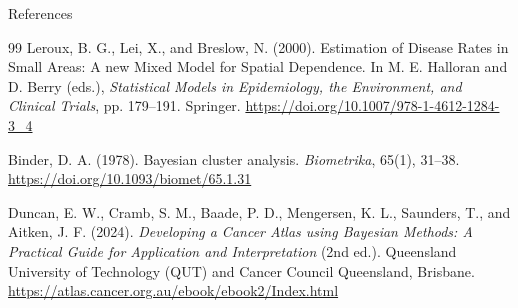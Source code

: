 \begin{frame}[allowframebreaks]{References}
\begin{thebibliography}{99}
Leroux, B. G., Lei, X., and Breslow, N. (2000).
\newblock Estimation of Disease Rates in Small Areas: A new Mixed Model for Spatial Dependence.
\newblock In M. E. Halloran and D. Berry (eds.),
\newblock \emph{Statistical Models in Epidemiology, the Environment, and Clinical Trials}, pp. 179--191. Springer.
\newblock \url{https://doi.org/10.1007/978-1-4612-1284-3_4}

Binder, D. A. (1978).
\newblock Bayesian cluster analysis.
\newblock \emph{Biometrika}, 65(1), 31--38.
\newblock \url{https://doi.org/10.1093/biomet/65.1.31}

Duncan, E. W., Cramb, S. M., Baade, P. D., Mengersen, K. L., Saunders, T., and Aitken, J. F. (2024).
\newblock \emph{Developing a Cancer Atlas using Bayesian Methods: A Practical Guide for Application and Interpretation} (2nd ed.).
\newblock Queensland University of Technology (QUT) and Cancer Council Queensland, Brisbane.
\newblock \url{https://atlas.cancer.org.au/ebook/ebook2/Index.html}

\end{thebibliography}
\end{frame}
